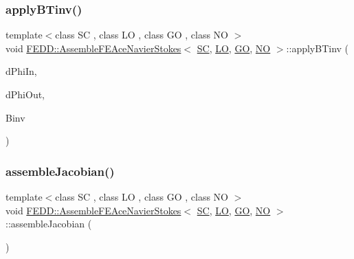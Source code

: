 \subsubsection{\texorpdfstring{apply\+B\+Tinv()}{applyBTinv()}}
{\footnotesize\ttfamily template$<$class SC , class LO , class GO , class NO $>$ \\
void \hyperlink{classFEDD_1_1AssembleFEAceNavierStokes}{F\+E\+D\+D\+::\+Assemble\+F\+E\+Ace\+Navier\+Stokes}$<$ \hyperlink{fe__test__laplace_8cpp_a79c7e86a57edbb2a5a53242bcd04e41e}{SC}, \hyperlink{fe__test__laplace_8cpp_ad6a38c9f07d3fd633eefca5bccad8410}{LO}, \hyperlink{fe__test__laplace_8cpp_afa2946b509009b4f45eb04bd8c5b27d9}{GO}, \hyperlink{fe__test__laplace_8cpp_a5e24f37b28787429872b6ecb1d0417ce}{NO} $>$\+::apply\+B\+Tinv (\begin{DoxyParamCaption}\item[{vec3\+D\+\_\+dbl\+\_\+ptr\+\_\+\+Type \&}]{d\+Phi\+In,  }\item[{vec3\+D\+\_\+dbl\+\_\+\+Type \&}]{d\+Phi\+Out,  }\item[{Small\+Matrix$<$ \hyperlink{fe__test__laplace_8cpp_a79c7e86a57edbb2a5a53242bcd04e41e}{SC} $>$ \&}]{Binv }\end{DoxyParamCaption})\hspace{0.3cm}{\ttfamily [private]}}

\mbox{\label{classFEDD_1_1AssembleFEAceNavierStokes_a1535786ac6b897da287e3e7e0aa60f61}} 
\subsubsection{\texorpdfstring{assemble\+Jacobian()}{assembleJacobian()}}
{\footnotesize\ttfamily template$<$class SC , class LO , class GO , class NO $>$ \\
void \hyperlink{classFEDD_1_1AssembleFEAceNavierStokes}{F\+E\+D\+D\+::\+Assemble\+F\+E\+Ace\+Navier\+Stokes}$<$ \hyperlink{fe__test__laplace_8cpp_a79c7e86a57edbb2a5a53242bcd04e41e}{SC}, \hyperlink{fe__test__laplace_8cpp_ad6a38c9f07d3fd633eefca5bccad8410}{LO}, \hyperlink{fe__test__laplace_8cpp_afa2946b509009b4f45eb04bd8c5b27d9}{GO}, \hyperlink{fe__test__laplace_8cpp_a5e24f37b28787429872b6ecb1d0417ce}{NO} $>$\+::assemble\+Jacobian (\begin{DoxyParamCaption}{ }\end{DoxyParamCaption})\hspace{0.3cm}{\ttfamily [virtual]}}



